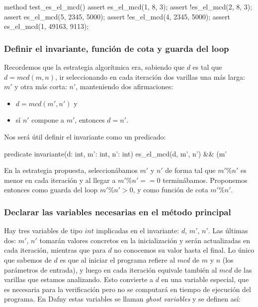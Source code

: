 \documentclass[12pt, a4paper, openany, fleqn]{book}
\begin{document}
    \vspace{1em}
    \begin{greenbox}
    \begin{dafny}[gobble=8]
        method test_es_el_mcd(){
            assert es_el_mcd(1, 8, 3);
            assert !es_el_mcd(2, 8, 3);
            assert es_el_mcd(5, 2345, 5000);
            assert !es_el_mcd(4, 2345, 5000);
            assert es_el_mcd(1, 49163, 9113);
        }
    \end{dafny}
    \end{greenbox}
    \vspace{1em}

    \subsubsection{Definir el invariante, función de cota y guarda del loop}

    Recordemos que la estrategia algorítmica era, sabiendo que $d$ es tal que $d = mcd(m, n)$, ir seleccionando en cada iteración dos varillas una más larga: $m'$ y otra más corta: $n'$, manteniendo dos afirmaciones:
    \begin{itemize}
        \item $d = mcd(m', n')$ y
        \item sí $n'$ compone a $m'$, entonces $d = n'$.
    \end{itemize}

    Nos será útil definir el invariante como un predicado:

    \vspace{1em}
    \begin{greenbox}
    \begin{dafny}[gobble=8]
        predicate invariante(d: int, m': int, n': int) {
            es_el_mcd(d, m', n')
            && (m' %
        }
    \end{dafny}
    \end{greenbox}
    \vspace{1em}

    En la estrategia propuesta, seleccionábamos $m'$ y $n'$ de forma tal que $m'\%n'$ es menor en cada iteración y al llegar a $m'\%n' == 0$ terminábamos. Proponemos entonces como guarda del loop $m'\%n'>0$, y como función de cota $m'\%n'$.

    \subsubsection{Declarar las variables necesarias en el método principal}
    Hay tres variables de tipo $int$ implicadas en el invariante: $d$, $m'$, $n'$.
    Las últimas dos: $m'$, $n'$ tomarán valores concretos en la inicialización y serán actualizadas en cada iteración, mientras que para $d$ no conocemos su valor hasta el final. Lo único que sabemos de $d$ es que al iniciar el programa refiere al $mcd$ de $m$ y $n$ (los parámetros de entrada), y luego en cada iteración equivale también al $mcd$ de las varillas que estamos analizando. Esto convierte a $d$ en una variable especial, que es necesaria para la verificación pero no se computará en tiempo de ejecución del programa. En Dafny estas variables se llaman \textit{ghost variables} y se definen así:
\end{document}

